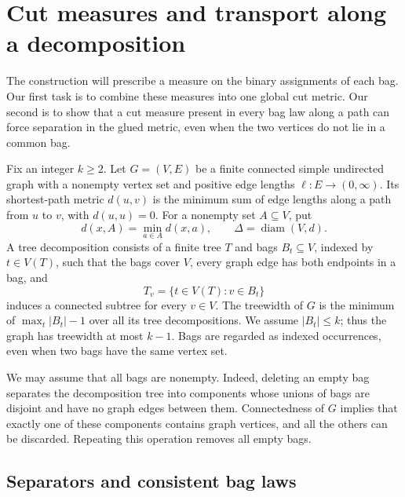 \section{Cut measures and transport along a decomposition}
\label{sec:cuts}

The construction will prescribe a measure on the binary assignments of
each bag.  Our first task is to combine these measures into one global
cut metric.  Our second is to show that a cut measure present in every bag law
along a path can force separation in the glued metric, even when the
two vertices do not lie in a common bag.

Fix an integer $k\geq 2$.
Let $G=(V,E)$ be a finite connected simple undirected graph with a
nonempty vertex set and positive edge lengths $\ell:E\to(0,\infty)$.
Its shortest-path metric $d(u,v)$ is the minimum sum of edge lengths
along a path from $u$ to $v$, with $d(u,u)=0$.
For a nonempty set $A\subseteq V$, put
\[
 d(x,A)=\min_{a\in A}d(x,a),
 \qquad
 \Delta=\operatorname{diam}(V,d).
\]
A tree decomposition consists of a finite tree $T$ and bags
$B_t\subseteq V$, indexed by $t\in V(T)$, such that the bags cover $V$,
every graph edge has both endpoints in a bag, and
\[
 T_v=\{t\in V(T):v\in B_t\}
\]
induces a connected subtree for every $v\in V$.
The treewidth of $G$ is the minimum of $\max_t|B_t|-1$ over all its
tree decompositions. We assume $|B_t|\leq k$; thus the graph has
treewidth at most $k-1$.
Bags are regarded as indexed occurrences, even when two bags have the same
vertex set.

We may assume that all bags are nonempty.
Indeed, deleting an empty bag separates the decomposition tree into
components whose unions of bags are disjoint and have no graph edges
between them. Connectedness of $G$ implies that exactly one of these
components contains graph vertices, and all the others can be discarded.
Repeating this operation removes all empty bags.

\subsection{Separators and consistent bag laws}

